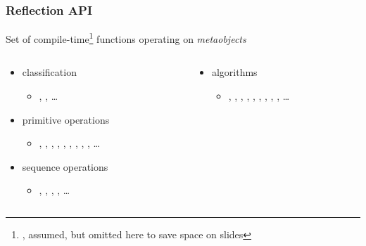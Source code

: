 \documentclass[compress,table,xcolor=table]{beamer}
\begin{document}
\begin{frame}[fragile]
  \frametitle{Reflection API}
  \larger
  Set of compile-time\footnote{, 
    assumed, but omitted here to save space on slides}
   functions operating on {\em metaobjects}
  \smaller
  \begin{columns}
    \begin{column}{.50\textwidth}
      \begin{itemize}
        \item classification
          \begin{itemize}
            \smaller
            \item {}, ,
              \ldots
          \end{itemize}
        \item primitive operations
          \begin{itemize}
            \smaller
            \item {}, ,
              , ,
              , ,
              ,
              , , \ldots
          \end{itemize}
        \item sequence operations
          \begin{itemize}
            \smaller
            \item {}, ,
              , , \ldots
          \end{itemize}
      \end{itemize}
    \end{column}
    \begin{column}{.50\textwidth}
      \begin{itemize}
        \item algorithms
          \begin{itemize}
            \smaller
            \item {}, ,
              , ,
              , ,
              , ,
              , \ldots

\end{itemize}
\end{itemize}
\end{column}
\end{columns}
\end{frame}
\end{document}
